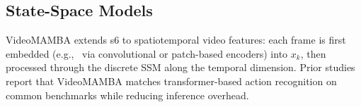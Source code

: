 \subsection{State-Space Models}
\label{ssec:state_space_models}


VideoMAMBA extends \acrshort{s6} to spatiotemporal video features: each frame is first embedded (e.g., \ via convolutional or patch-based encoders) into \(x_k\), then processed through the discrete SSM along the temporal dimension. Prior studies \cite{lee_enhancing_mamba_s6_2024, li_videomamba_2024} report that VideoMAMBA matches transformer-based action recognition on common benchmarks while reducing inference overhead.

